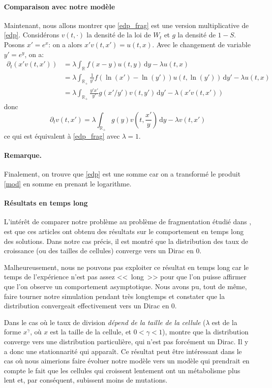 \documentclass[12pt]{article}
\newcounter{thm}
\newcommand{\req}[1]{\paragraph{Remarque.}#1\vspace{0.1cm}}
\newcommand{\pth}[1]{\left(#1\right)}
\newcommand{\Er}{\mathbb{R}}
\newcommand{\de}{\,\mathrm{d}}
\newcommand{\dr}{\partial}
\begin{document}
\paragraph{Comparaison avec notre modèle}

Maintenant, nous allons montrer que \eqref{edp_frag} est une version multiplicative de \eqref{edp}.  Considérons $v(t,\cdot)$ la densité de la loi de $W_t$ et $g$ la densité de $1-S$. Posons $x'=e^x$: on a alors $x'v(t,x')=u(t,x)$. Avec le changement de variable $y'=e^y$, on a:
\begin{align*}
  \dr_t(x'v(t,x'))
  &=\lambda\int_{\Er}f(x-y)u(t,y)\de y-\lambda u(t,x)\\
  &=\lambda\int_{\Er_+}\frac{1}{y'}f(\ln(x')-\ln(y'))u(t,\ln(y'))\de y'-\lambda u(t,x)\\
  &=\lambda\int_{\Er_+}\frac{y'x'}{y'}g(x'/y')v\pth{t,y'}\de y'-\lambda\pth{x'v(t,x')}
\end{align*}
donc 
\[\dr_tv(t,x')=\lambda\int_{\Er_+}g(y)v\pth{t,\frac{x'}{y}}\de y-\lambda v(t,x')\]
ce qui est équivalent à \eqref{edp_frag} avec $\lambda=1$.

\req{Finalement, on trouve que \eqref{edp} est une somme car on a transformé le produit \eqref{mod} en somme en prenant le logarithme.}


\paragraph{Résultats en temps long} L'intérêt de comparer notre problème au problème de fragmentation étudié dans \cite{md1}, \cite{md2} est que ces articles ont obtenu des résultats sur le comportement en temps long des solutions. Dans notre cas précis, il est montré que la distribution des taux de croissance (ou des tailles de cellules) converge vers un Dirac en 0. 

Malheureusement, nous ne pouvons pas exploiter ce résultat en temps long car le temps de l'expérience n'est pas assez <<~long~>> pour que l'on puisse affirmer que l'on observe un comportement asymptotique. Nous avons pu, tout de même, faire tourner notre simulation pendant très longtemps et constater que la distribution convergeait effectivement vers un Dirac en 0.

Dans le cas où le taux de division \emph{dépend de la taille de la cellule} ($\lambda$ est de la forme $x^{\gamma}$, où $x$ est la taille de la cellule, et $0<\gamma<1$), \cite{md2} montre que la distribution converge vers une distribution particulière, qui n'est pas forcément un Dirac. Il y a donc une stationnarité qui apparaît. Ce résultat peut être intéressant dans le cas où nous aimerions faire évoluer notre modèle vers un modèle qui prendrait en compte le fait que les cellules qui croissent lentement ont un métabolisme plus lent et, par conséquent, subissent moins de mutations.
\end{document}
